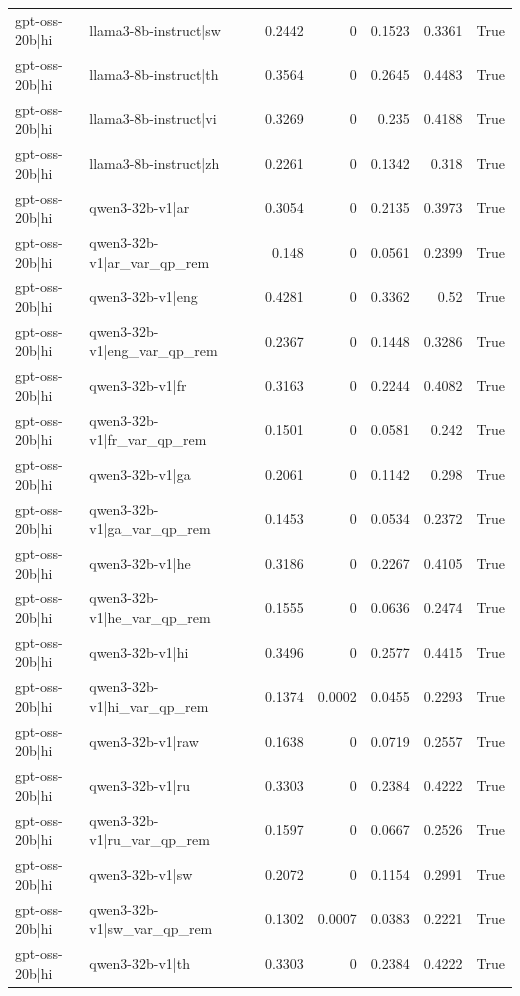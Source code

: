 \begin{table}
\begin{tabular}{l l r r r r l}
gpt-oss-20b|hi & llama3-8b-instruct|sw & 0.2442 & 0 & 0.1523 & 0.3361 & True \\
gpt-oss-20b|hi & llama3-8b-instruct|th & 0.3564 & 0 & 0.2645 & 0.4483 & True \\
gpt-oss-20b|hi & llama3-8b-instruct|vi & 0.3269 & 0 & 0.235 & 0.4188 & True \\
gpt-oss-20b|hi & llama3-8b-instruct|zh & 0.2261 & 0 & 0.1342 & 0.318 & True \\
gpt-oss-20b|hi & qwen3-32b-v1|ar & 0.3054 & 0 & 0.2135 & 0.3973 & True \\
gpt-oss-20b|hi & qwen3-32b-v1|ar_var_qp_rem & 0.148 & 0 & 0.0561 & 0.2399 & True \\
gpt-oss-20b|hi & qwen3-32b-v1|eng & 0.4281 & 0 & 0.3362 & 0.52 & True \\
gpt-oss-20b|hi & qwen3-32b-v1|eng_var_qp_rem & 0.2367 & 0 & 0.1448 & 0.3286 & True \\
gpt-oss-20b|hi & qwen3-32b-v1|fr & 0.3163 & 0 & 0.2244 & 0.4082 & True \\
gpt-oss-20b|hi & qwen3-32b-v1|fr_var_qp_rem & 0.1501 & 0 & 0.0581 & 0.242 & True \\
gpt-oss-20b|hi & qwen3-32b-v1|ga & 0.2061 & 0 & 0.1142 & 0.298 & True \\
gpt-oss-20b|hi & qwen3-32b-v1|ga_var_qp_rem & 0.1453 & 0 & 0.0534 & 0.2372 & True \\
gpt-oss-20b|hi & qwen3-32b-v1|he & 0.3186 & 0 & 0.2267 & 0.4105 & True \\
gpt-oss-20b|hi & qwen3-32b-v1|he_var_qp_rem & 0.1555 & 0 & 0.0636 & 0.2474 & True \\
gpt-oss-20b|hi & qwen3-32b-v1|hi & 0.3496 & 0 & 0.2577 & 0.4415 & True \\
gpt-oss-20b|hi & qwen3-32b-v1|hi_var_qp_rem & 0.1374 & 0.0002 & 0.0455 & 0.2293 & True \\
gpt-oss-20b|hi & qwen3-32b-v1|raw & 0.1638 & 0 & 0.0719 & 0.2557 & True \\
gpt-oss-20b|hi & qwen3-32b-v1|ru & 0.3303 & 0 & 0.2384 & 0.4222 & True \\
gpt-oss-20b|hi & qwen3-32b-v1|ru_var_qp_rem & 0.1597 & 0 & 0.0667 & 0.2526 & True \\
gpt-oss-20b|hi & qwen3-32b-v1|sw & 0.2072 & 0 & 0.1154 & 0.2991 & True \\
gpt-oss-20b|hi & qwen3-32b-v1|sw_var_qp_rem & 0.1302 & 0.0007 & 0.0383 & 0.2221 & True \\
gpt-oss-20b|hi & qwen3-32b-v1|th & 0.3303 & 0 & 0.2384 & 0.4222 & True \\

\end{tabular}
\end{table}
